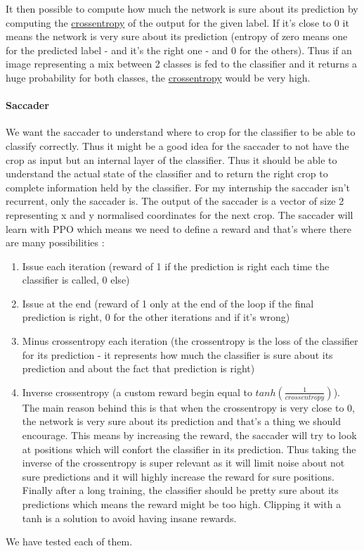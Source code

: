 \documentclass[11pt]{article}
\begin{document}
 It then possible to compute how much the network is sure about its prediction by computing the \underline{crossentropy} of the output for the given label. If it's close to 0 it means the network is very sure about its prediction (entropy of zero means one for the predicted label - and it's the right one - and 0 for the others). Thus if an image representing a mix between 2 classes is fed to the classifier and it returns a huge probability for both classes, the \underline{crossentropy} would be very high.
\paragraph{Saccader}
We want the saccader to understand where to crop for the classifier to be able to classify correctly. Thus it might be a good idea for the saccader to not have the crop as input but an internal layer of the classifier. Thus it should be able to understand the actual state of the classifier and to return the right crop to complete information held by the classifier. For my internship the saccader isn't recurrent, only the saccader is. The output of the saccader is a vector of size 2 representing x and y normalised coordinates for the next crop. The saccader will learn with PPO which means we need to define a reward and that's where there are many possibilities :
\begin{enumerate}
\item Issue each iteration (reward of 1 if the prediction is right each time the classifier is called, 0 else)
\item Issue at the end (reward of 1 only at the end of the loop if the final prediction is right, 0 for the other iterations and if it's wrong)
\item Minus crossentropy each iteration (the crossentropy is the loss of the classifier for its prediction - it represents how much the classifier is sure about its prediction and about the fact that prediction is right)
\item Inverse crossentropy (a custom reward begin equal to $tanh(\frac{1}{crossentropy})$). The main reason behind this is that when the crossentropy is very close to 0, the network is very sure about its prediction and that's a thing we should encourage. This means by increasing the reward, the saccader will try to look at positions which will confort the classifier in its prediction. Thus taking the inverse of the crossentropy is super relevant as it will limit noise about not sure predictions and it will highly increase the reward for sure positions. Finally after a long training, the classifier should be pretty sure about its predictions which means the reward might be too high. Clipping it with a tanh is a solution to avoid having insane rewards.
\end{enumerate}
We have tested each of them.
\end{document}
